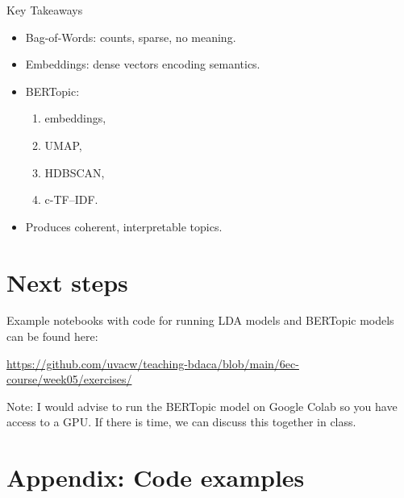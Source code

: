\documentclass[compress]{beamer}
\begin{document}
\begin{frame}{Key Takeaways}
    \begin{itemize}
        \item Bag-of-Words: counts, sparse, no meaning.
        \item Embeddings: dense vectors encoding semantics.
        \item BERTopic:
        \begin{enumerate}
            \item embeddings,
            \item UMAP,
            \item HDBSCAN,
            \item c-TF--IDF.
        \end{enumerate}
        \item Produces coherent, interpretable topics.
    \end{itemize}
\end{frame}



\section{Next steps}

\begin{frame}[standout]

Example notebooks with code for running LDA models and BERTopic models can be found here:
\large{\url{https://github.com/uvacw/teaching-bdaca/blob/main/6ec-course/week05/exercises/}

Note: I would advise to run the BERTopic model on Google Colab so you have access to a GPU. If there is time, we 
can discuss this together in class. }
\end{frame}


\begin{frame}
	\printbibliography
\end{frame}


\section[Appendix]{Appendix: Code examples}
\end{document}
